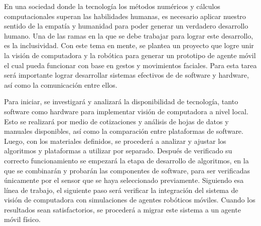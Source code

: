 En una sociedad donde la tecnología los métodos numéricos y cálculos computacionales superan las habilidades humanas, es necesario aplicar nuestro sentido de la empatía y humanidad para poder generar un verdadero desarrollo humano. Una de las ramas en la que se debe trabajar para lograr este desarrollo, es la inclusividad. Con este tema en mente, se plantea un proyecto que logre unir la visión de computadora y la robótica para generar un prototipo de agente móvil el cual pueda funcionar con base en gestos y movimientos faciales. Para esta tarea será importante lograr desarrollar sistemas efectivos de de software y hardware, así como la comunicación entre ellos. 

Para iniciar, se investigará y analizará la disponibilidad de tecnología, tanto software como hardware para implementar visión de computadora a nivel local. Esto se realizará por medio de cotizaciones y análisis de hojas de datos y manuales disponibles, así como la comparación entre plataformas de software. Luego, con los materiales definidos, se procederá a analizar y ajustar los algoritmos y plataformas a utilizar por separado. Después de verificado su correcto funcionamiento se empezará la etapa de desarrollo de algoritmos, en la que se combinarán y probarán las componentes de software, para ser verificadas únicamente por el sensor que se haya seleccionado previamente. Siguiendo esa línea de trabajo, el siguiente paso será verificar la integración del sistema de visión de computadora con simulaciones de agentes robóticos móviles. Cuando los resultados sean satisfactorios, se procederá a migrar este sistema a un agente móvil físico. 


